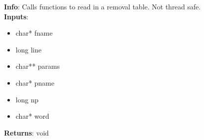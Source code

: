 \textbf{Info}: Calls functions to read in a removal table. Not thread safe.\\

\noindent \textbf{Inputs}:
\begin{itemize}
\item{char* fname}
\item{long line}
\item{char** params}
\item{char* pname}
\item{long np}
\item{char* word}
\end{itemize}

\noindent \textbf{Returns}: void
